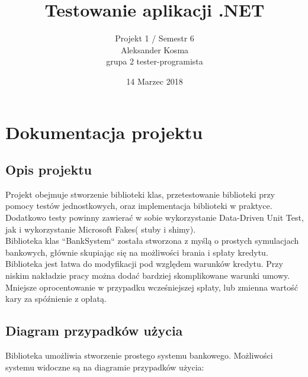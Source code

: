 \documentclass[8pt]{article}
\title{Testowanie aplikacji .NET}
\author{Projekt 1 / Semestr 6\\ Aleksander Kosma\\grupa 2 tester-programista}
\date{14 Marzec 2018}
\begin{document}
\maketitle 

\section*{Dokumentacja projektu}
\subsection*{ Opis projektu}
Projekt obejmuje stworzenie biblioteki klas, przetestowanie biblioteki przy pomocy testów jednostkowych, oraz implementacja biblioteki w praktyce. Dodatkowo testy powinny zawierać w sobie wykorzystanie Data-Driven Unit Test, jak i wykorzystanie Microsoft Fakes( stuby i shimy).\\
Biblioteka klas ``BankSystem`` została stworzona z myślą o prostych symulacjach bankowych, głównie skupiając się na możliwości brania i spłaty kredytu. Biblioteka jest łatwa do modyfikacji pod względem warunków kredytu. Przy niskim nakładzie pracy można dodać bardziej skomplikowane warunki umowy. Mniejsze oprocentowanie w przypadku wcześniejszej spłaty, lub zmienna wartość kary za spóźnienie z opłatą.\\
\subsection*{ Diagram przypadków użycia}
Biblioteka umożliwia stworzenie prostego systemu bankowego. Możliwości systemu widoczne są na diagramie przypadków użycia:\\
\end{document}
